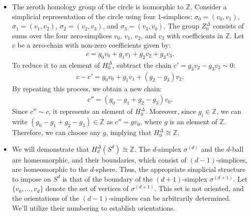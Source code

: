 \begin{example}\noindent
	\begin{itemize}
		\item The zeroth homology group of the circle is isomorphic to \(\mathbb{Z}\).
		      Consider a simplicial representation of the circle using four \(1\)-simplices:
		      \(\sigma_{0} = (v_{0}, v_{1})\), \(\sigma_{1} = (v_{1}, v_{2})\), \(\sigma_{2} = (v_{2}, v_{3})\), and \(\sigma_{3} = (v_{3}, v_{0})\).
		      The group \(Z^{\Delta}_{0}\) consists of sums over the four zero-simplices \(v_{0}\),
		      \(v_{1}\), \(v_{2}\), and \(v_{3}\) with coefficients in \(\mathbb{Z}\). Let \(c\) be a zero-chain
		      with non-zero coefficients given by:
		      \begin{align}
		      	c = g_{0} v_{0} + g_{1} v_{1} + g_{2} v_{2} + g_{3} v_{3}. 
		      \end{align}
		      To reduce it to an element of \(H^{\Delta}_{0}\), subtract the chain \(c' = g_{3} v_{2} - g_{3} v_{3} \sim 0\):
		      \begin{align}
		      	c - c' = g_{0} v_{0} + g_{1} v_{1} + (g_{2} - g_{3}) v_{2}. 
		      \end{align}
		      By repeating this process, we obtain a new chain:
		      \begin{align}
		      	c'' = (g_{0} - g_{1} + g_{2} - g_{3}) v_{0}. 
		      \end{align}
		      Since \(c'' \sim c\), it represents an element of \(H^{\Delta}_{0}\). Moreover,
		      since \(g_{i} \in \mathbb{Z}\), we can write
		      \((g_{0} - g_{1} + g_{2} - g_{3}) \in \mathbb{Z}\) as \(c'' = g v_{0}\), where \(g\)
		      is an element of \(\mathbb{Z}\). Therefore, we can choose any \(g\), implying
		      that \(H^{\Delta}_{0} \cong \mathbb{Z}\).
		      		      		      		      
		\item We will demonstrate that \(H^{\Delta}_{d}(S^{d}) \cong \mathbb{Z}\). The
		      \(d\)-simplex \(\sigma^{(d)}\) and the \(d\)-ball are homeomorphic, and their boundaries,
		      which consist of \((d-1)\)-simplices, are homeomorphic to the \(d\)-sphere.
		      Thus, the appropriate simplicial structure to impose on \(S^{d}\) is that of
		      the boundary of the \((d+1)\)-simplex \(\sigma^{(d+1)}\). Let
		      \(\{v_{0}, \ldots, v_{d}\}\) denote the set of vertices of
		      \(\sigma^{(d+1)}\). This set is not oriented, and the orientations of the
		      \((d-1)\)-simplices can be arbitrarily determined. We'll utilize their numbering
		      to establish orientations.
		      		      		      		      

\end{itemize}
\end{example}
